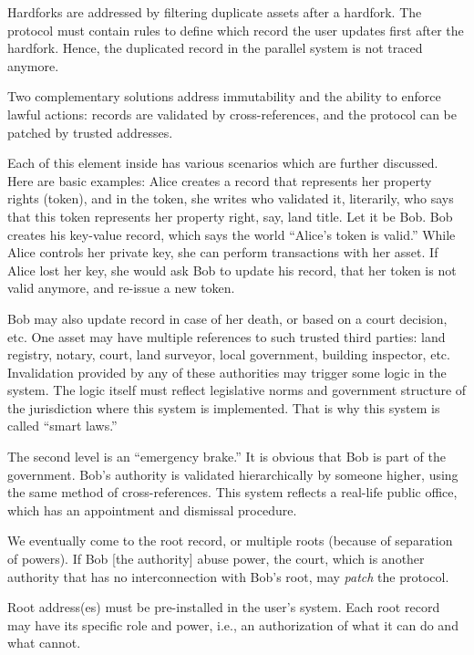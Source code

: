 \begin{multicols}{2}
Hardforks are addressed by filtering duplicate assets after a hardfork. The protocol must contain rules to define which record the user updates first after the hardfork. Hence, the duplicated record in the parallel system is not traced anymore.
 
Two complementary solutions address immutability and the ability to enforce lawful actions: records are validated by cross-references, and the protocol can be patched by trusted addresses.

Each of this element inside has various scenarios which are further discussed. Here are basic examples: Alice creates a record that represents her property rights (token), and in the token, she writes who validated it, literarily, who says that this token represents her property right, say, land title. Let it be Bob. Bob creates his key-value record, which says the world “Alice’s token is valid.” While Alice controls her private key, she can perform transactions with her asset. If Alice lost her key, she would ask Bob to update his record, that her token is not valid anymore, and re-issue a new token. 

Bob may also update record in case of her death, or based on a court decision, etc. One asset may have multiple references to such trusted third parties: land registry, notary, court, land surveyor, local government, building inspector, etc. Invalidation provided by any of these authorities may trigger some logic in the system. The logic itself must reflect legislative norms and government structure of the jurisdiction where this system is implemented. That is why this system is called “smart laws.”

The second level is an “emergency brake.” It is obvious that Bob is part of the government. Bob’s authority is validated hierarchically by someone higher, using the same method of cross-references. This system reflects a real-life public office, which has an appointment and dismissal procedure.

We eventually come to the root record, or multiple roots (because of separation of powers). If Bob [the authority] abuse power, the court, which is another authority that  has no interconnection with Bob’s root, may \textit{patch} the protocol.

Root address(es) must be pre-installed in the user’s system. Each root record may have its specific role and power, i.e., an authorization of what it can do and what cannot.


\end{multicols}
